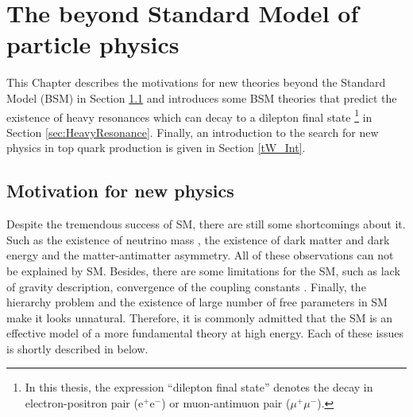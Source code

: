 \chapter{The beyond Standard Model of particle physics}\label{chp:BSM}
This Chapter describes the motivations for new theories beyond the Standard Model (BSM) in Section \ref{sec:BSM} and introduces some BSM theories that predict the existence of heavy resonances which can decay to a dilepton final state \footnote{In this thesis, the expression ``dilepton final state''  denotes the decay in electron-positron pair ($\mathrm{e^{+}e^{-}}$) or muon-antimuon pair ($\mu^{+}\mu^{-}$).} in Section \ref{sec:HeavyResonance}. Finally, an introduction to the search for new physics in top quark production is given in Section \ref{tW_Int}.

\section{Motivation for new physics} \label{sec:BSM}
Despite the tremendous success of SM, there are still some shortcomings about it. Such as the existence of neutrino mass \cite{Fukuda:1998mi,Abe:2011fz}, the existence of dark matter and dark energy \cite{Rubin:1970zza,Freese:2008cz} and the matter-antimatter asymmetry. All of these observations can not be explained by SM. Besides, there are some limitations for the SM, such as lack of gravity description, convergence of the coupling constants \cite{const_running}. Finally, the hierarchy problem and the existence of large number of free parameters in SM \cite{Olive:2016xmw} make it looks unnatural. Therefore, it is commonly admitted that the SM is an effective model of a more fundamental theory at high energy. Each of these issues is shortly described in below.

